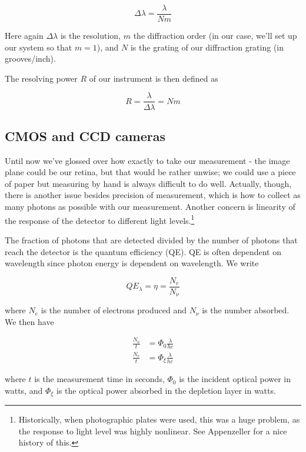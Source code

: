 \documentclass{../lab}
\begin{document}
\begin{equation}
    \Delta \lambda= \frac{\lambda}{Nm}
\end{equation}

Here again $\Delta \lambda$ is the resolution, $m$ the diffraction order (in our case, we'll set up our system so that $m=1$), and $N$ is the grating of our diffraction grating (in grooves/inch). 

The resolving power $R$ of our instrument is then defined as

\begin{equation}
    R = \frac{\lambda}{\Delta \lambda}=Nm
\end{equation}

\subsection{CMOS and CCD cameras}

Until now we've glossed over how exactly to take our measurement - the image plane could be our retina, but that would be rather unwise; we could use a piece of paper but measuring by hand is always difficult to do well. Actually, though, there is another issue besides precision of measurement, which is how to collect as many photons as possible with our measurement. Another concern is linearity of the response of the detector to different light levels.\footnote{Historically, when photographic plates were used, this was a huge problem, as the response to light level was highly nonlinear. See Appenzeller for a nice history of this.} 

The fraction of photons that are detected divided by the number of photons that reach the detector is the quantum efficiency (QE). QE is often dependent on wavelength since photon energy is dependent on wavelength. We write

\begin{equation}
    QE_\lambda = \eta = \frac{N_e}{N_\nu}
\end{equation}

where $N_e$ is the number of electrons produced and $N_\nu$ is the number absorbed. We then have

\begin{align}
    \frac{N_\nu}{t} &= \Phi_0\frac{\lambda}{hc}\\
    \frac{N_e}{t} &= \Phi_\xi\frac{\lambda}{hc}
\end{align}

where $t$ is the measurement time in seconds, $\Phi_0$ is the incident optical power in watts, and $\Phi_\xi$ is the optical power absorbed in the depletion layer in watts.
\end{document}

